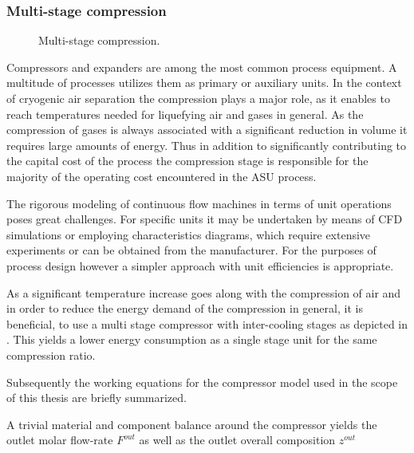     \subsubsection{Multi-stage compression}
        \begin{figure}
            \center
            
            \caption{Multi-stage compression.}
            \label{fig:multi_stage_compression}
        \end{figure}

        Compressors and expanders are among the most common process equipment. A multitude of processes
        utilizes them as primary or auxiliary units. In the context of cryogenic air separation the
        compression plays a major role, as it enables to reach temperatures needed for liquefying
        air and gases in general. As the compression of gases is always associated with a significant
        reduction in volume it requires large amounts of energy. Thus in addition to significantly
        contributing to the capital cost of the process the compression stage is responsible for
        the majority of the operating cost encountered in the ASU process.

        The rigorous modeling of continuous flow machines in terms of unit operations poses great challenges.
        For specific units it may be undertaken by means of CFD simulations or employing characteristics diagrams,
        which require extensive experiments or can be obtained from the manufacturer.
        For the purposes of process design however a simpler approach with unit efficiencies is appropriate.

        As a significant temperature increase goes along with the compression of air and in order to reduce
        the energy demand of the compression in general, it is beneficial, to use a multi stage compressor with
        inter-cooling stages as depicted in . This yields a lower energy consumption
        as a single stage unit for the same compression ratio.

        Subsequently the working equations for the compressor model used in the scope of this thesis are
        briefly summarized.

        A trivial material and component balance around the compressor yields the outlet molar flow-rate $F^{out}$
        as well as the outlet overall composition $z^{out}$

